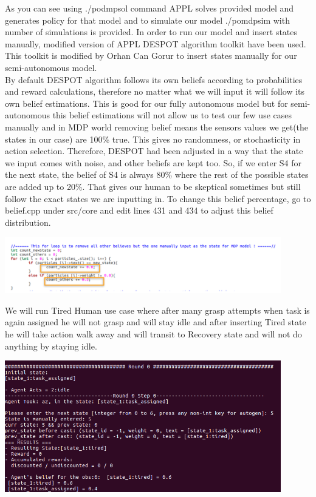 As you can see using ./podmpsol command APPL solves provided model and generates policy for that model and to simulate our model ./pomdpsim with number of simulations is provided. In order to run our model and insert states manually, modified version of APPL DESPOT algorithm toolkit have been used. This toolkit is modified by Orhan Can Gorur to insert states manually for our semi-autonomous model. \\
By default DESPOT algorithm follows its own beliefs according to probabilities and reward calculations, therefore no matter what we will input it will follow its own belief estimations. This is good for our fully autonomous model but for semi-autonomous this belief estimations will not allow us to test our few use cases manually and in MDP world removing belief means the sensors values we get(the states in our case) are 100\% true. This gives no randomness, or stochasticity in action selection. Therefore, DESPOT had been adjusted in a way that the state we input comes with noise, and other beliefs are kept too. So, if we enter S4 for the next state, the belief of S4 is always 80\% where the rest of the possible states are added up to 20\%. That gives our human to be skeptical sometimes but still follow the exact states we are inputting in. To change this belief percentage, go to belief.cpp under src/core and edit lines 431 and 434 to adjust this belief distribution.

\begin{minipage}{0.8\textwidth}
\centering
	\includegraphics[width=12cm]{Pictures/func/MDP/MDP6.png}
	\label{fig:MDP6}
\end{minipage}

We will run Tired Human use case where after many grasp attempts when task is again assigned he will not grasp and will stay idle and after inserting Tired state he will take action walk away and will transit to Recovery state and will not do anything by staying idle.

\begin{minipage}{0.8\textwidth}
\centering
	\includegraphics[width=12cm]{Pictures/func/MDP/MDP7.png}
	\label{fig:MDP7}
\end{minipage}

